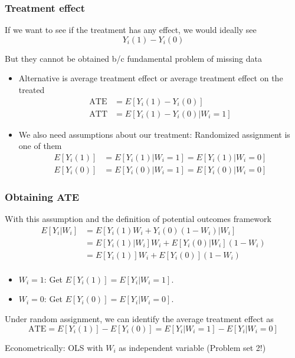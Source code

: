\documentclass[aspectratio=169]{beamer}
\newenvironment{wideitemize}{\itemize\addtolength{\itemsep}{10pt}}{\enditemize}
\begin{document}
\begin{frame}
\frametitle{Treatment effect}
\begin{wideitemize}
\item If we want to see if the treatment has any effect, we would ideally see
\[
Y_i(1)-Y_i(0)
\]
\item But they cannot be obtained b/c fundamental problem of missing data
\begin{itemize}
\item Alternative is average treatment effect or average treatment effect on the treated
\[
\begin{aligned}
\text{ATE}&=E[Y_i(1)-Y_i(0)]\\
\text{ATT}&=E[Y_i(1)-Y_i(0)|W_i=1]
\end{aligned}
\]
\item We also need assumptions about our treatment: Randomized assignment is one of them
\[
\begin{aligned}
E[Y_i(1)]&= E[Y_i(1)|W_i=1]=E[Y_i(1)|W_i=0] \\
E[Y_i(0)]&= E[Y_i(0)|W_i=1]=E[Y_i(0)|W_i=0] 
\end{aligned}
\]
\end{itemize}
 \end{wideitemize}
\end{frame}

\begin{frame}
\frametitle{Obtaining ATE}
\begin{wideitemize}
\item With this assumption and the definition of potential outcomes framework
\[
\begin{aligned}
E[Y_i|W_i]&=E[Y_i(1)W_i + Y_i(0)(1-W_i)|W_i]\\
&=E[Y_i(1)|W_i]W_i+E[Y_i(0)|W_i](1-W_i)\\
&=E[Y_i(1)]W_i+E[Y_i(0)](1-W_i)\\
\end{aligned}
\]
\begin{itemize}
\item $W_i=1$: Get $E[Y_i(1)]=E[Y_i|W_i=1]$.
\item $W_i=0$: Get $E[Y_i(0)]=E[Y_i|W_i=0]$. 
\end{itemize}
\item Under random assignment, we can identify the average treatment effect as
\[
\text{ATE}=E[Y_i(1)]-E[Y_i(0)] = E[Y_i|W_i=1]-E[Y_i|W_i=0]
\]
\item Econometrically: OLS with $W_i$ as independent variable (Problem set 2!)
 \end{wideitemize}
\end{frame}
\end{document}
